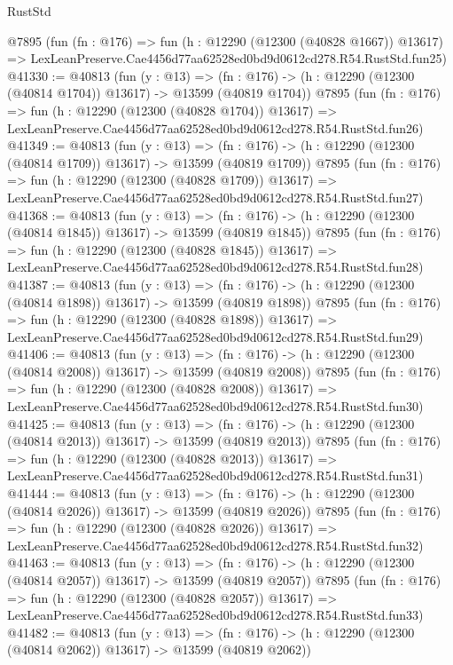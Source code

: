 \begin{lexlean}{RustStd}
\begin{coremodule}
    @7895
    (fun (fn : @176) =>
    fun (h : @12290 (@12300 (@40828 @1667)) @13617) =>
    LexLeanPreserve.Cae4456d77aa62528ed0bd9d0612cd278.R54.RustStd.fun25)
@41330 := @40813
    (fun (y : @13) =>
    (fn : @176) -> (h : @12290 (@12300 (@40814 @1704)) @13617) -> @13599 (@40819 @1704))
    @7895
    (fun (fn : @176) =>
    fun (h : @12290 (@12300 (@40828 @1704)) @13617) =>
    LexLeanPreserve.Cae4456d77aa62528ed0bd9d0612cd278.R54.RustStd.fun26)
@41349 := @40813
    (fun (y : @13) =>
    (fn : @176) -> (h : @12290 (@12300 (@40814 @1709)) @13617) -> @13599 (@40819 @1709))
    @7895
    (fun (fn : @176) =>
    fun (h : @12290 (@12300 (@40828 @1709)) @13617) =>
    LexLeanPreserve.Cae4456d77aa62528ed0bd9d0612cd278.R54.RustStd.fun27)
@41368 := @40813
    (fun (y : @13) =>
    (fn : @176) -> (h : @12290 (@12300 (@40814 @1845)) @13617) -> @13599 (@40819 @1845))
    @7895
    (fun (fn : @176) =>
    fun (h : @12290 (@12300 (@40828 @1845)) @13617) =>
    LexLeanPreserve.Cae4456d77aa62528ed0bd9d0612cd278.R54.RustStd.fun28)
@41387 := @40813
    (fun (y : @13) =>
    (fn : @176) -> (h : @12290 (@12300 (@40814 @1898)) @13617) -> @13599 (@40819 @1898))
    @7895
    (fun (fn : @176) =>
    fun (h : @12290 (@12300 (@40828 @1898)) @13617) =>
    LexLeanPreserve.Cae4456d77aa62528ed0bd9d0612cd278.R54.RustStd.fun29)
@41406 := @40813
    (fun (y : @13) =>
    (fn : @176) -> (h : @12290 (@12300 (@40814 @2008)) @13617) -> @13599 (@40819 @2008))
    @7895
    (fun (fn : @176) =>
    fun (h : @12290 (@12300 (@40828 @2008)) @13617) =>
    LexLeanPreserve.Cae4456d77aa62528ed0bd9d0612cd278.R54.RustStd.fun30)
@41425 := @40813
    (fun (y : @13) =>
    (fn : @176) -> (h : @12290 (@12300 (@40814 @2013)) @13617) -> @13599 (@40819 @2013))
    @7895
    (fun (fn : @176) =>
    fun (h : @12290 (@12300 (@40828 @2013)) @13617) =>
    LexLeanPreserve.Cae4456d77aa62528ed0bd9d0612cd278.R54.RustStd.fun31)
@41444 := @40813
    (fun (y : @13) =>
    (fn : @176) -> (h : @12290 (@12300 (@40814 @2026)) @13617) -> @13599 (@40819 @2026))
    @7895
    (fun (fn : @176) =>
    fun (h : @12290 (@12300 (@40828 @2026)) @13617) =>
    LexLeanPreserve.Cae4456d77aa62528ed0bd9d0612cd278.R54.RustStd.fun32)
@41463 := @40813
    (fun (y : @13) =>
    (fn : @176) -> (h : @12290 (@12300 (@40814 @2057)) @13617) -> @13599 (@40819 @2057))
    @7895
    (fun (fn : @176) =>
    fun (h : @12290 (@12300 (@40828 @2057)) @13617) =>
    LexLeanPreserve.Cae4456d77aa62528ed0bd9d0612cd278.R54.RustStd.fun33)
@41482 := @40813
    (fun (y : @13) =>
    (fn : @176) -> (h : @12290 (@12300 (@40814 @2062)) @13617) -> @13599 (@40819 @2062))

\end{coremodule}
\end{lexlean}
